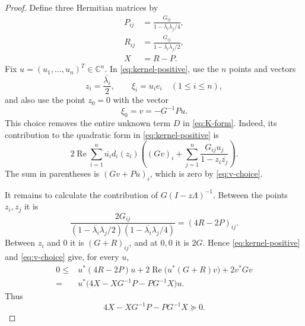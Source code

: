 \documentclass[11pt]{article}
\newcommand{\C}{\mathbb C}
\newcommand{\RePart}{\operatorname{Re}}
\begin{document}
\begin{proof}
Define three Hermitian matrices by
\begin{equation}
 \begin{split}
 P_{ij}&=\frac{G_{ij}}{1-\overline{\lambda_i}\lambda_j/4},\\
 R_{ij}&=\frac{G_{ij}}{1-\overline{\lambda_i}\lambda_j/2},\\
 X&=R-P.
 \end{split}
 \label{eq:PRX}
\end{equation}
Fix \(u=(u_1,\ldots,u_n)^T\in\C^n\).  In
\eqref{eq:kernel-positive}, use the \(n\) points and vectors
\[
 z_i=\frac{\overline{\lambda_i}}2,
 \qquad
 \xi_i=u_i e_i
 \quad(1\leq i\leq n),
\]
and also use the point \(z_0=0\) with the vector
\begin{equation}
 \xi_0=v=-G^{-1}Pu.
 \label{eq:v-choice}
\end{equation}
This choice removes the entire unknown term \(D\) in \eqref{eq:K-form}.
Indeed, its contribution to the quadratic form in
\eqref{eq:kernel-positive} is
\[
 2\RePart\sum_{i=1}^n
 \overline{u_i}d_i(z_i)
 \left(
 (Gv)_i+
 \sum_{j=1}^n
 \frac{G_{ij}u_j}{1-z_i\overline{z_j}}
 \right).
\]
The sum in parentheses is \((Gv+Pu)_i\), which is zero by
\eqref{eq:v-choice}.

It remains to calculate the contribution of
\(G(I-z\Lambda)^{-1}\).  Between the points \(z_i,z_j\) it is
\[
 \frac{2G_{ij}}
 {(1-\overline{\lambda_i}\lambda_j/2)
  (1-\overline{\lambda_i}\lambda_j/4)}
 =(4R-2P)_{ij}.
\]
Between \(z_i\) and \(0\) it is \((G+R)_{ij}\), and at \(0,0\) it is
\(2G\).  Hence \eqref{eq:kernel-positive} and \eqref{eq:v-choice} give,
for every \(u\),
\[
 \begin{split}
 0\leq{}&u^*(4R-2P)u
       +2\RePart\bigl(u^*(G+R)v\bigr)+2v^*Gv\\
 ={}&u^*\bigl(4X-XG^{-1}P-PG^{-1}X\bigr)u.
 \end{split}
\]
Thus
\begin{equation}
 4X-XG^{-1}P-PG^{-1}X\succeq0.
 \label{eq:X-inequality}
\end{equation}


\end{proof}
\end{document}
